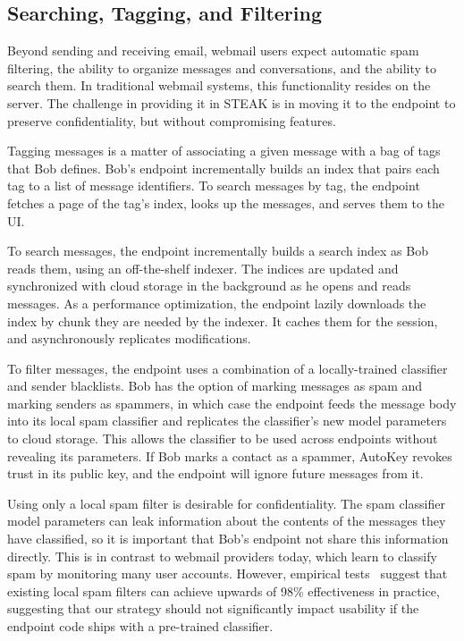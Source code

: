 \subsection{Searching, Tagging, and Filtering}
Beyond sending and receiving email, webmail users expect automatic spam filtering, the ability to organize messages and conversations, and the ability to search them.  In traditional webmail systems, this functionality resides on the server.  The challenge in providing it in STEAK is in moving it to the endpoint to preserve confidentiality, but without compromising features.

Tagging messages is a matter of associating a given message with a bag of tags that Bob defines.  Bob's endpoint incrementally builds an index that pairs each tag to a list of message identifiers.  To search messages by tag, the endpoint fetches a page of the tag's index, looks up the messages, and serves them to the UI.

To search messages, the endpoint incrementally builds a search index as Bob reads them, using an off-the-shelf indexer.  The indices are updated and synchronized with cloud storage in the background as he opens and reads messages.  As a performance optimization, the endpoint lazily downloads the index by chunk they are needed by the indexer.  It caches them for the session, and asynchronously replicates modifications.

To filter messages, the endpoint uses a combination of a locally-trained classifier and sender blacklists.  Bob has the option of marking messages as spam and marking senders as spammers, in which case the endpoint feeds the message body into its local spam classifier and replicates the classifier's new model parameters to cloud storage.  This allows the classifier to be used across endpoints without revealing its parameters.  If Bob marks a contact as a spammer, AutoKey revokes trust in its public key, and the endpoint will ignore future messages from it.

Using only a local spam filter is desirable for confidentiality.  The spam classifier model parameters can leak information about the contents of the messages they have classified, so it is important that Bob's endpoint not share this information directly.  This is in contrast to webmail providers today, which learn to classify spam by monitoring many user accounts.  However, empirical tests~\cite{local-spam-filter-eval} suggest that existing local spam filters can achieve upwards of 98\% effectiveness in practice, suggesting that our strategy should not significantly impact usability if the endpoint code ships with a pre-trained classifier.

